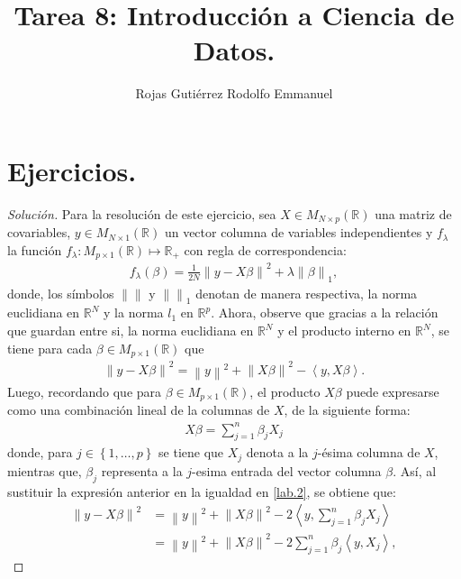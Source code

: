 \documentclass[10.5pt,notitlepage]{article}
\title{Tarea 8: Introducción a Ciencia de Datos.}
\author{Rojas Gutiérrez Rodolfo Emmanuel}
\newenvironment{solucion}
  {\begin{proof}[Solución]}
  {\end{proof}}
\newcommand{\RR}{\mathbb{R}}
\newcommand{\norm}[1]{\left\| #1 \right\|}
\newcommand{\inner}[1]{\left\langle #1 \right\rangle}
\newcommand{\kis}[1]{\left\{ #1 \right\}}
\theoremstyle{plain}
\begin{document}
\maketitle
\section{Ejercicios.}
\setcounter{exo}{0}
\begin{exo}

\end{exo}
\begin{solucion}
Para la resolución de este ejercicio, sea \(X \in M_{N \times p}(\RR)\) una matriz de covariables, \(y \in M_{N \times 1}(\RR)\) un vector columna de variables independientes y \(f_{\lambda}\) la función \(f_{\lambda}: M_{p \times 1}(\RR) \mapsto \RR_{+}\) con regla de correspondencia:
\begin{align}\label{lab.1}
    f_{\lambda}(\beta) =\frac{1}{2N}\norm{y - X\beta}^2 +\lambda \norm{\beta}_{1}, 
\end{align}
donde, los símbolos \(\norm{}\) y \(\norm{}_1\) denotan de manera respectiva, la norma euclidiana en \(\RR^{N}\) y la norma \(l_1\) en \(\RR^{p}\). Ahora, observe que gracias a la relación que guardan entre si, la norma euclidiana en \(\RR^{N}\) y el producto interno en \(\RR^N\), se tiene para cada \(\beta \in M_{p \times 1}(\RR)\) que
\begin{align}\label{lab.2}
    \norm{y - X\beta}^2 = \norm{y}^2 + \norm{X \beta}^2 - \inner{y, X\beta}. 
\end{align}
Luego, recordando que para \(\beta \in M_{p \times 1}(\RR)\), el producto \(X \beta\) puede expresarse como una combinación lineal de la columnas de \(X\), de la siguiente forma:
\begin{align*}
    X\beta  = \sum_{j = 1}^{n}\beta_{j}X_{j} 
\end{align*}
donde, para \(j \in \kis{1, \hdots, p}\) se tiene que \(X_{j}\) denota a la \(j\)-ésima columna de \(X\), mientras que, \(\beta_{j}\) representa a la \(j\)-esima entrada del vector columna \(\beta\). Así, al sustituir la expresión anterior en la igualdad en \eqref{lab.2}, se obtiene que:
\begin{align}
     \norm{y - X\beta}^2 &=  \norm{y}^2 + \norm{X \beta}^2 - 2\inner{y, \sum_{j = 1}^{n}\beta_{j}X_{j}} \nonumber\\  
                         &=  \norm{y}^2 + \norm{X \beta}^2 - 2\sum_{j = 1}^{n}\beta_{j}\inner{y,X_{j}} \label{lab.3},
\end{align}

\end{solucion}
\end{document}

